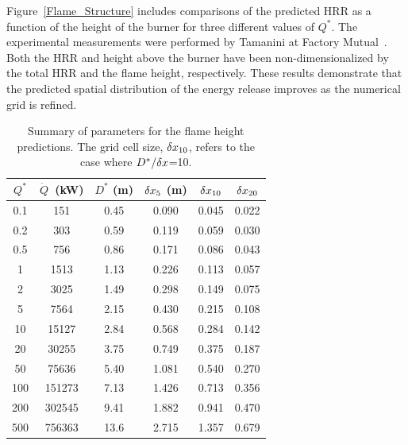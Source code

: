 Figure~\ref{Flame_Structure} includes comparisons of the predicted HRR as a function of the height of the burner for three different values of $Q^*$. The experimental measurements were performed by Tamanini at Factory Mutual~\cite{Tamanini:CF1983}. Both the HRR and height above the burner have been non-dimensionalized by the total HRR and the flame height, respectively. These results demonstrate that the predicted spatial distribution of the energy release improves as the numerical grid is refined.

\clearpage

\begin{table}[h!]
\caption[Summary of parameters for the flame height predictions]{Summary of parameters for the flame height predictions. The grid cell size, $\delta x_{10}$, refers to the case where $D^*/\delta x$=10.}
\begin{center}
\begin{tabular}{|c|c|c|c|c|c|}
\hline
$Q^*$       & $\dot{Q}$~(kW) & $D^*$ (m)  & $\delta x_5$ (m)  & $\delta x_{10}$  & $\delta x_{20}$ \\ \hline \hline
0.1         &   151          & 0.45       & 0.090        & 0.045       &  0.022     \\ \hline
0.2         &   303          & 0.59       & 0.119        & 0.059       &  0.030     \\ \hline
0.5         &   756          & 0.86       & 0.171        & 0.086       &  0.043     \\ \hline
1           &   1513         & 1.13       & 0.226        & 0.113       &  0.057     \\ \hline
2           &   3025         & 1.49       & 0.298        & 0.149       &  0.075     \\ \hline
5           &   7564         & 2.15       & 0.430        & 0.215       &  0.108     \\ \hline
10          &   15127        & 2.84       & 0.568        & 0.284       &  0.142     \\ \hline
20          &   30255        & 3.75       & 0.749        & 0.375       &  0.187     \\ \hline
50          &   75636        & 5.40       & 1.081        & 0.540       &  0.270     \\ \hline
100         &   151273       & 7.13       & 1.426        & 0.713       &  0.356     \\ \hline
200         &   302545       & 9.41       & 1.882        & 0.941       &  0.470     \\ \hline
500         &   756363       & 13.6       & 2.715        & 1.357       &  0.679     \\ \hline

\end{tabular}
\end{center}
\end{table}
